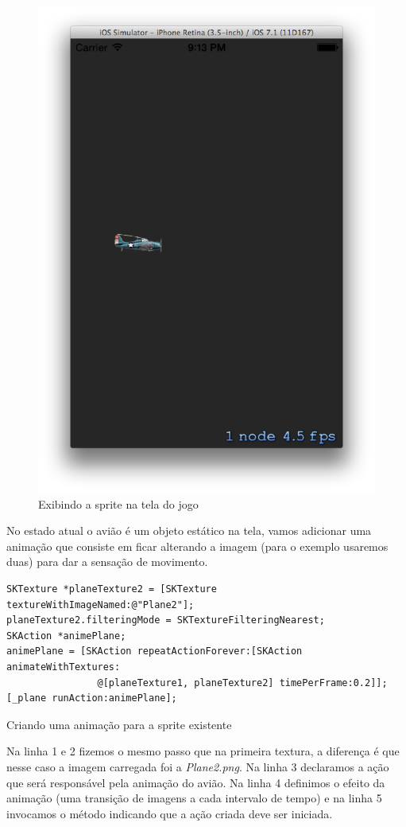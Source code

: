 \documentclass[a4paper,12pt,brazil,doubleside]{book}
\begin{document}
\begin{singlespace}
\begin{figure}[H]
  \centering
  \includegraphics[width=.75\textwidth]{figuras/6/plane4.png}
  \caption{Exibindo a sprite na tela do jogo}
  \label{fig:a}
\end{figure}

No estado atual o avião é um objeto estático na tela, vamos adicionar uma animação que consiste em ficar alterando a imagem (para o exemplo usaremos duas) para dar a sensação de movimento.

\begin{listing}[H]
\begin{verbatim}
SKTexture *planeTexture2 = [SKTexture textureWithImageNamed:@"Plane2"];
planeTexture2.filteringMode = SKTextureFilteringNearest;
SKAction *animePlane;
animePlane = [SKAction repeatActionForever:[SKAction animateWithTextures:
				@[planeTexture1, planeTexture2] timePerFrame:0.2]];
[_plane runAction:animePlane];
\end{verbatim}
\caption{Criando uma animação para a sprite existente}
\end{listing}

Na linha 1 e 2 fizemos o mesmo passo que na primeira textura, a diferença é que nesse caso a imagem carregada foi a \emph{Plane2.png}. Na linha 3 declaramos a ação que será responsável pela animação do avião. Na linha 4 definimos o efeito da animação (uma transição de imagens a cada intervalo de tempo) e na linha 5 invocamos o método indicando que a ação criada deve ser iniciada.


\end{singlespace}
\end{document}

